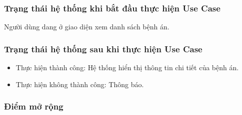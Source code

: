 \subsubsection{Trạng thái hệ thống khi bắt đầu thực hiện Use Case}
Người dùng dang ở giao diện xem danh sách bệnh án.

\subsubsection{Trạng thái hệ thống sau khi thực hiện Use Case}
\begin{itemize}
  \item Thực hiện thành công: Hệ thống hiển thị thông tin chi tiết của bệnh án.
  \item Thực hiện không thành công: Thông báo.
\end{itemize}

\subsubsection{Điểm mở rộng}